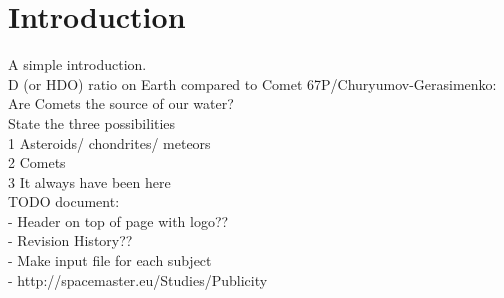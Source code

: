 
\section{Introduction}
A simple introduction.\\

D (or HDO) ratio on Earth compared to Comet 67P/Churyumov-Gerasimenko: Are Comets the source of our water?\\

State the three possibilities \\
	1 Asteroids/ chondrites/ meteors\\
	2 Comets\\
	3 It always have been here\\

TODO document:\\
- Header on top of page with logo??\\
- Revision History??\\
- Make input file for each subject\\
- http://spacemaster.eu/Studies/Publicity